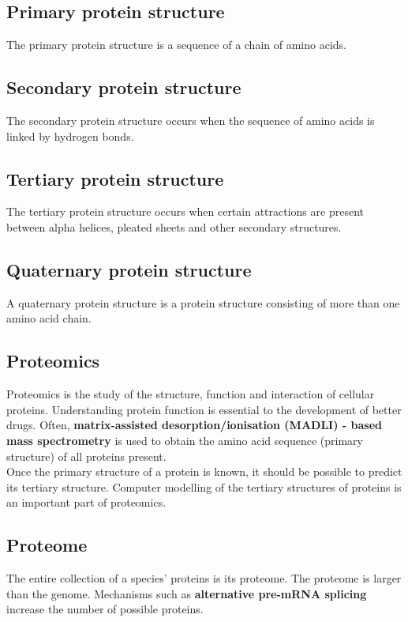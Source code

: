 \documentclass[11pt]{article}
\begin{document}
\subsection{Primary protein structure}
\label{sec:org066be02}
The primary protein structure is a sequence of a chain of amino acids.

\subsection{Secondary protein structure}
\label{sec:orgd51b6b2}
The secondary protein structure occurs when the sequence of amino acids is linked by hydrogen bonds.

\subsection{Tertiary protein structure}
\label{sec:org2ddee90}
The tertiary protein structure occurs when certain attractions are present between alpha helices, pleated sheets and other secondary structures.

\subsection{Quaternary protein structure}
\label{sec:org32c0b81}
A quaternary protein structure is a protein structure consisting of more than one amino acid chain.

\subsection{Proteomics}
\label{sec:org20c989e}
Proteomics is the study of the structure, function and interaction of cellular proteins. Understanding protein function is essential to the development of better drugs. Often, \textbf{matrix-assisted desorption/ionisation (MADLI) - based mass spectrometry} is used to obtain the amino acid sequence (primary structure) of all proteins present.
\\[0pt]

Once the primary structure of a protein is known, it should be possible to predict its tertiary structure. Computer modelling of the tertiary structures of proteins is an important part of proteomics.

\subsection{Proteome}
\label{sec:org88327a4}
The entire collection of a species' proteins is its proteome. The proteome is larger than the genome. Mechanisms such as \textbf{alternative pre-mRNA splicing} increase the number of possible proteins.
\end{document}
